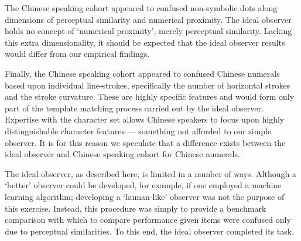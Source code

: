 The Chinese speaking cohort appeared to confused non-symbolic dots along dimensions of perceptual similarity and numerical proximity. The ideal observer holds no concept of `numerical proximity', merely perceptual similarity. Lacking this extra dimensionality, it should be expected that the ideal observer results would differ from our empirical findings. 

Finally, the Chinese speaking cohort appeared to confused Chinese numerals based upon individual line-strokes, specifically the number of horizontal strokes and the stroke curvature. These are highly specific features and would form only part of the template matching process carried out by the ideal observer. Expertise with the character set allows Chinese speakers to focus upon highly distinguishable character features --- something not afforded to our simple observer. It is for this reason we speculate that a difference exists between the ideal observer and Chinese speaking cohort for Chinese numerals.

The ideal observer, as described here, is limited in a number of ways. Although a `better' observer could be developed, for example, if one employed a machine learning algorithm; developing a `human-like' observer was not the purpose of this exercise. Instead, this procedure was simply to provide a benchmark comparison with which to compare performance given items were confused only due to perceptual similarities. To this end, the ideal observer completed its task.

\pagebreak